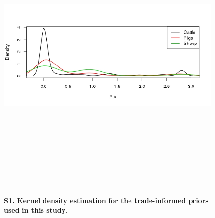 \documentclass[10pt]{article}
\begin{document}
\newpage
\begin{figure}[!ht]
\begin{center}
\includegraphics[width=15cm,height=15cm]{FIGURES/trade_info.jpeg}
\end{center}
\caption*{
{\bf S1. Kernel density estimation for the trade-informed priors used in this study}.\\
}

\label{sfig:tradeinfo}
\end{figure}

\newpage
\end{document}
